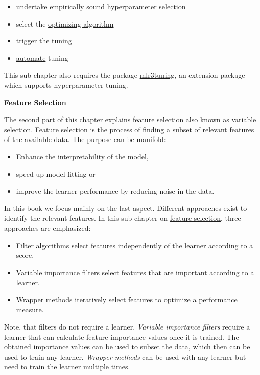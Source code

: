 \documentclass[]{article}
\providecommand{\tightlist}{%
  \setlength{\itemsep}{0pt}\setlength{\parskip}{0pt}}
\begin{document}
\begin{itemize}
\tightlist
\item
  undertake empirically sound \protect\hyperlink{tuning}{hyperparameter selection}
\item
  select the \protect\hyperlink{tuning-optimization}{optimizing algorithm}
\item
  \protect\hyperlink{tuning-triggering}{trigger} the tuning
\item
  \protect\hyperlink{autotuner}{automate} tuning
\end{itemize}

This sub-chapter also requires the package \href{https://mlr3tuning.mlr-org.com}{mlr3tuning}, an extension package which supports hyperparameter tuning.

\textbf{Feature Selection}

The second part of this chapter explains \protect\hyperlink{fs}{feature selection} also known as variable selection.
\protect\hyperlink{fs}{Feature selection} is the process of finding a subset of relevant features of the available data.
The purpose can be manifold:

\begin{itemize}
\tightlist
\item
  Enhance the interpretability of the model,
\item
  speed up model fitting or
\item
  improve the learner performance by reducing noise in the data.
\end{itemize}

In this book we focus mainly on the last aspect.
Different approaches exist to identify the relevant features.
In this sub-chapter on \protect\hyperlink{fs}{feature selection}, three approaches are emphasized:

\begin{itemize}
\tightlist
\item
  \protect\hyperlink{fs-filter}{Filter} algorithms select features independently of the learner according to a score.
\item
  \protect\hyperlink{fs-var-imp-filter}{Variable importance filters} select features that are important according to a learner.
\item
  \protect\hyperlink{fs-wrapper}{Wrapper methods} iteratively select features to optimize a performance measure.
\end{itemize}

Note, that filters do not require a learner.
\emph{Variable importance filters} require a learner that can calculate feature importance values once it is trained.
The obtained importance values can be used to subset the data, which then can be used to train any learner.
\emph{Wrapper methods} can be used with any learner but need to train the learner multiple times.
\end{document}
